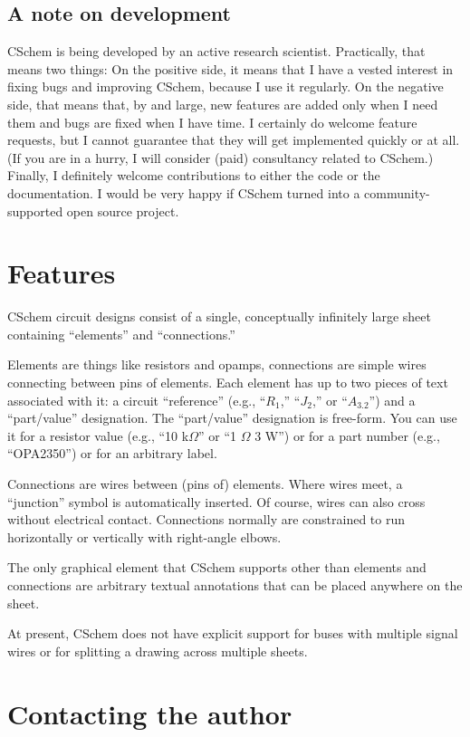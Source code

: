 \documentclass[11pt]{report}
\def\Ohm{$\Omega$}
\begin{document}
\subsection{A note on development}
CSchem is being developed by an
active research scientist. Practically, that means two things: On the
positive side, it means that I have a vested interest in fixing bugs
and improving CSchem, because I use it regularly. On the negative side, that
means that, by and large, new features are added only when I need them
and bugs are fixed when I have time. I certainly do welcome feature
requests, but I cannot guarantee that they will get implemented
quickly or at all. (If you are in a hurry, I will consider (paid)
consultancy related to CSchem.) Finally, I definitely welcome
contributions to either the code or the documentation. I would be very
happy if CSchem turned into a community-supported open source project.

\section{Features}

CSchem circuit designs consist of a single, conceptually infinitely
large sheet containing ``elements'' and ``connections.''

Elements are things like resistors and opamps, connections are simple
wires connecting between pins of elements. Each element has up to two
pieces of text associated with it: a circuit ``reference'' (e.g.,
``$R_1$,'' ``$J_2$,'' or ``$A_{3.2}$'') and a ``part/value''
designation. The ``part/value'' designation is free-form. You can use
it for a resistor value (e.g., ``10 k\Ohm'' or ``1 \Ohm{} 3 W'') or
for a part number (e.g., ``OPA2350'') or for an arbitrary
label.

Connections are wires between (pins of) elements. Where wires meet, a
``junction'' symbol is automatically inserted. Of course, wires can
also cross without electrical contact. Connections normally are
constrained to run horizontally or vertically with right-angle elbows.

The only graphical element that CSchem supports other than elements
and connections are arbitrary textual annotations that can be placed anywhere on
the sheet.

At present, CSchem does not have explicit support for buses with
multiple signal wires or for splitting a drawing across multiple sheets.

\section{Contacting the author}
\end{document}
